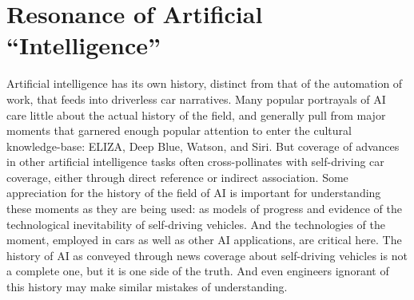 \section{Resonance of Artificial ``Intelligence''}
Artificial intelligence has its own history, distinct from that of the
automation of work, that feeds into driverless car narratives. Many popular
portrayals of AI care little about the actual history of the field,
and generally pull from major moments that garnered enough popular
attention to enter the cultural knowledge-base: ELIZA, Deep Blue,
Watson, and Siri. But coverage of advances in other artificial
intelligence tasks often cross-pollinates with self-driving car
coverage, either through direct reference or indirect association.
Some appreciation for the history of the field
of AI is important for understanding these moments as they are being
used:  as models of progress and evidence of the technological inevitability of
self-driving vehicles. And the technologies of the moment, employed in
cars as well as other AI applications, are critical here. The history
of AI as conveyed through news coverage about self-driving vehicles is
not a complete one, but it is one side of the truth. And even
engineers ignorant of this history may make similar mistakes of understanding.


